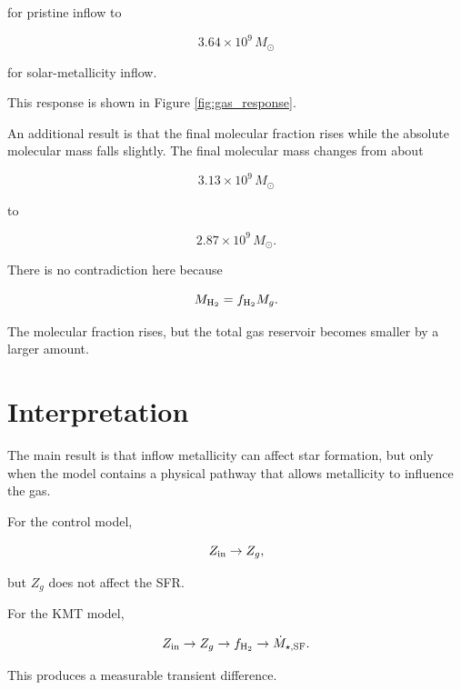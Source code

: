 \documentclass[10pt,a4paper]{article}
\newcommand{\SFR}{\dot{M}_{\star,\mathrm{SF}}}
\begin{document}
for pristine inflow to

\begin{equation}
3.64\times10^9\,M_\odot
\end{equation}

for solar-metallicity inflow.

This response is shown in Figure \ref{fig:gas_response}.

An additional result is that the final molecular fraction rises while the absolute molecular mass falls slightly. The final molecular mass changes from about

\begin{equation}
3.13\times10^9\,M_\odot
\end{equation}

to

\begin{equation}
2.87\times10^9\,M_\odot.
\end{equation}

There is no contradiction here because

\begin{equation}
M_{\rm H_2}=f_{\rm H_2}M_g.
\end{equation}

The molecular fraction rises, but the total gas reservoir becomes smaller by a larger amount.

\section{Interpretation}

The main result is that inflow metallicity can affect star formation, but only when the model contains a physical pathway that allows metallicity to influence the gas.

For the control model,

\begin{equation}
Z_{\rm in}
\rightarrow
Z_g,
\end{equation}

but \(Z_g\) does not affect the SFR.

For the KMT model,

\begin{equation}
Z_{\rm in}
\rightarrow
Z_g
\rightarrow
f_{\rm H_2}
\rightarrow
\SFR.
\end{equation}

This produces a measurable transient difference.
\end{document}
